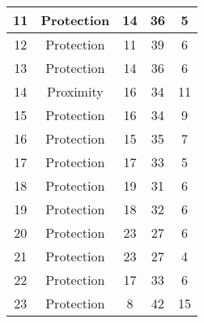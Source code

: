 \documentclass[results.tex]{subfiles}
\begin{document}
\begin{center}
\begin{tabular}{| c || c | c | c | c |}
            \hline
            11                      & Protection                   & 14                     & 36                      & 5                    \\
            \hline
            12                      & Protection                   & 11                     & 39                      & 6                    \\
            \hline
            13                      & Protection                   & 14                     & 36                      & 6                    \\
            \hline
            14                      & Proximity                    & 16                     & 34                      & 11                   \\
            \hline
            15                      & Protection                   & 16                     & 34                      & 9                    \\
            \hline
            16                      & Protection                   & 15                     & 35                      & 7                    \\
            \hline
            17                      & Protection                   & 17                     & 33                      & 5                    \\
            \hline
            18                      & Protection                   & 19                     & 31                      & 6                    \\
            \hline
            19                      & Protection                   & 18                     & 32                      & 6                    \\
            \hline
            20                      & Protection                   & 23                     & 27                      & 6                    \\
            \hline
            21                      & Protection                   & 23                     & 27                      & 4                    \\
            \hline
            22                      & Protection                   & 17                     & 33                      & 6                    \\
            \hline
            23                      & Protection                   & 8                      & 42                      & 15                   \\

\end{tabular}
\end{center}
\end{document}
